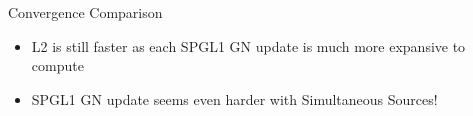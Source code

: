 \documentclass[12pt]{beamer}
\begin{document}
\begin{frame}{Convergence Comparison}

\begin{figure}
\end{figure}
\begin{itemize}
  \item L2 is still faster as each SPGL1 GN update is much more expansive to compute
  \item SPGL1 GN update seems even harder with Simultaneous Sources!
\end{itemize}
\end{frame}
\end{document}

